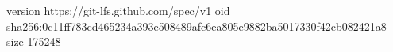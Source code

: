 version https://git-lfs.github.com/spec/v1
oid sha256:0c11ff783cd465234a393e508489afc6ea805e9882ba5017330f42cb082421a8
size 175248
